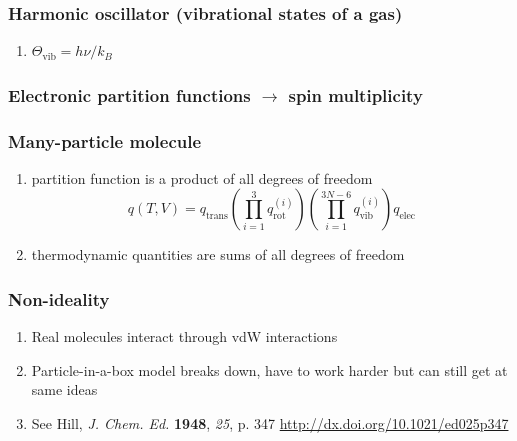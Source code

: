 \documentclass[11pt]{article}
\begin{document}
\subsubsection{Harmonic oscillator (vibrational states of a gas)}
\label{sec:org50ff2ca}
\begin{enumerate}
\item \(\Theta_\mathrm{vib}=h\nu/k_B\)
\end{enumerate}

\subsubsection{Electronic partition functions \(\rightarrow\) spin multiplicity}
\label{sec:org216cd3a}

\subsubsection{Many-particle molecule}
\label{sec:org21a681e}
\begin{enumerate}
\item partition function is a product of all degrees of freedom
\begin{displaymath}
q(T,V) = q_\text{trans} \left ( \prod_{i=1}^3 q_\text{rot}^{(i)}\right ) \left (  \prod_{i = 1}^{3N-6} q_\text{vib}^{(i)}\right ) q_\text{elec}
 \end{displaymath}
\item thermodynamic quantities are sums of all degrees of freedom
\end{enumerate}
\subsubsection{Non-ideality}
\label{sec:orgecec9ff}
\begin{enumerate}
\item Real molecules interact through vdW interactions
\item Particle-in-a-box model breaks down, have to work harder but can still get at same ideas
\item See Hill, \emph{J. Chem. Ed.} \textbf{1948}, \emph{25}, p. 347 \url{http://dx.doi.org/10.1021/ed025p347}
\end{enumerate}
\end{document}
